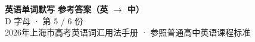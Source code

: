 \documentclass[10pt,a4paper]{article}
\begin{document}
\pagestyle{plain}

\begin{center}
{\LARGE\bfseries 英语单词默写 \quad 参考答案（英 $\to$ 中）}\\[0.22em]
{\large D 字母 · 第 5 / 6 份}\\[0.18em]
{\small 2026年上海市高考英语词汇用法手册 · 参照普通高中英语课程标准}
\end{center}

\vspace{0.2em}
\noindent{\color{rulegray}\rule{\textwidth}{0.8pt}}

\vspace{0.35em}

\vspace{0.25em}
\renewcommand{\arraystretch}{1.32}
\end{document}
